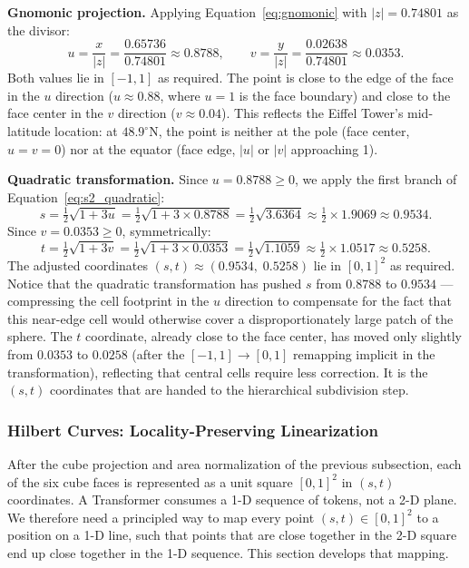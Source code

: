 \documentclass{book}
\begin{document}
\medskip
\noindent\textbf{Gnomonic projection.}
Applying Equation~\eqref{eq:gnomonic} with $|z| = 0.74801$ as the
divisor:
\[
  u = \frac{x}{|z|} = \frac{0.65736}{0.74801} \approx 0.8788,
  \qquad
  v = \frac{y}{|z|} = \frac{0.02638}{0.74801} \approx 0.0353.
\]
Both values lie in $[-1, 1]$ as required.  The point is close to the
edge of the face in the $u$ direction ($u \approx 0.88$, where $u = 1$
is the face boundary) and close to the face center in the $v$
direction ($v \approx 0.04$).  This reflects the Eiffel Tower's
mid-latitude location: at $48.9^\circ$N, the point is neither at the
pole (face center, $u = v = 0$) nor at the equator (face edge,
$|u|$ or $|v|$ approaching 1).

\medskip
\noindent\textbf{Quadratic transformation.}
Since $u = 0.8788 \geq 0$, we apply the first branch of
Equation~\eqref{eq:s2_quadratic}:
\[
  s = \tfrac{1}{2}\sqrt{1 + 3u}
    = \tfrac{1}{2}\sqrt{1 + 3 \times 0.8788}
    = \tfrac{1}{2}\sqrt{3.6364}
    \approx \tfrac{1}{2} \times 1.9069
    \approx 0.9534.
\]
Since $v = 0.0353 \geq 0$, symmetrically:
\[
  t = \tfrac{1}{2}\sqrt{1 + 3v}
    = \tfrac{1}{2}\sqrt{1 + 3 \times 0.0353}
    = \tfrac{1}{2}\sqrt{1.1059}
    \approx \tfrac{1}{2} \times 1.0517
    \approx 0.5258.
\]
The adjusted coordinates $(s, t) \approx (0.9534,\; 0.5258)$ lie in
$[0, 1]^2$ as required.  Notice that the quadratic transformation has
pushed $s$ from $0.8788$ to $0.9534$ --- compressing the cell
footprint in the $u$ direction to compensate for the fact that this
near-edge cell would otherwise cover a disproportionately large patch
of the sphere.  The $t$ coordinate, already close to the face center,
has moved only slightly from $0.0353$ to $0.0258$ (after the $[-1,1]
\to [0,1]$ remapping implicit in the transformation), reflecting that
central cells require less correction.  It is the $(s, t)$ coordinates
that are handed to the hierarchical subdivision step.

\subsubsection{Hilbert Curves: Locality-Preserving Linearization}
\label{sec:hilbert}

After the cube projection and area normalization of the previous
subsection, each of the six cube faces is represented as a unit square
$[0,1]^2$ in $(s,t)$ coordinates.  A Transformer consumes a 1-D
sequence of tokens, not a 2-D plane.  We therefore need a principled
way to map every point $(s,t) \in [0,1]^2$ to a position on a 1-D
line, such that points that are close together in the 2-D square end
up close together in the 1-D sequence.  This section develops that
mapping.
\end{document}
